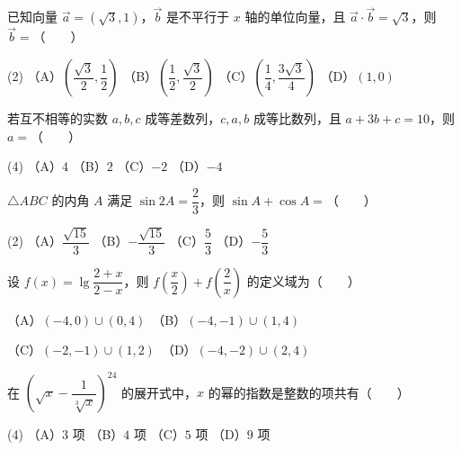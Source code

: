 \begin{question}
已知向量 $\vec a=(\sqrt3,1)$，$\vec b$ 是不平行于 $x$ 轴的单位向量，且 $\vec a\cdot\vec b=\sqrt3$，则 $\vec b=$\mbox{（　　）}

\begin{gkopts}(2)
\task （A）$\left(\dfrac{\sqrt3}{2},\dfrac12\right)$
\task （B）$\left(\dfrac12,\dfrac{\sqrt3}{2}\right)$
\task （C）$\left(\dfrac14,\dfrac{3\sqrt3}{4}\right)$
\task （D）$(1,0)$
\end{gkopts}

\end{question}
\begin{question}
若互不相等的实数 $a,b,c$ 成等差数列，$c,a,b$ 成等比数列，且 $a+3b+c=10$，则 $a=$\mbox{（　　）}

\begin{gkopts}(4)
\task （A）$4$
\task （B）$2$
\task （C）$-2$
\task （D）$-4$
\end{gkopts}

\end{question}
\begin{question}
$\triangle ABC$ 的内角 $A$ 满足 $\sin 2A=\dfrac23$，则 $\sin A+\cos A=$\mbox{（　　）}

\begin{gkopts}(2)
\task （A）$\dfrac{\sqrt{15}}3$
\task （B）$-\dfrac{\sqrt{15}}3$
\task （C）$\dfrac53$
\task （D）$-\dfrac53$
\end{gkopts}

\end{question}
\begin{question}
设 $f(x)=\lg\dfrac{2+x}{2-x}$，则 $f\left(\dfrac{x}{2}\right)+f\left(\dfrac{2}{x}\right)$ 的定义域为\mbox{（　　）}

（A）$(-4,0)\cup(0,4)$　（B）$(-4,-1)\cup(1,4)$

（C）$(-2,-1)\cup(1,2)$　（D）$(-4,-2)\cup(2,4)$

\end{question}
\begin{question}
在 $\left(\sqrt{x}-\dfrac{1}{\sqrt[3]{x}}\right)^{24}$ 的展开式中，$x$ 的幂的指数是整数的项共有\mbox{（　　）}

\begin{gkopts}(4)
\task （A）$3$ 项
\task （B）$4$ 项
\task （C）$5$ 项
\task （D）$9$ 项
\end{gkopts}

\end{question}
